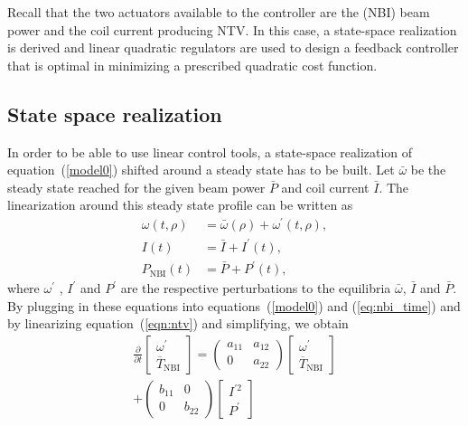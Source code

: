 \documentclass{iopart}
\begin{document}
 Recall that the two actuators available to the controller are the (NBI) beam power and the coil current producing NTV.
In this case, a state-space realization is derived and linear quadratic regulators are used to design a feedback controller that is optimal in minimizing a prescribed quadratic cost function.

\subsection{State space realization}
\label{SS}
In order to be able to use linear control tools, a state-space realization of equation~(\ref{model0})  shifted around a steady state has to be built.
Let $\bar{\omega}$ be the steady state reached for the given beam power $ \bar{P}$ and coil current $\bar{I}$. The linearization around this steady state profile can be written as
\begin{align}
\omega (t, \rho) &= \bar{\omega} (\rho) + \omega^{'}(t, \rho), \\
I (t) &= \bar{I} + I^{'}(t),\\
P_\text{NBI} (t) &= \bar{P} + P^{'}(t),
\end{align}
where $ \omega^{'}$ , $ I^{'}$ and $P^{'}$ are the respective perturbations to the equilibria $\bar{\omega}$, $\bar{I}$ and $\bar{P}$.
By plugging in these equations into equations~(\ref{model0}) and (\ref{eq:nbi_time}) and by linearizing equation~(\ref{eqn:ntv}) and simplifying, we obtain
\begin{multline}
	\frac{\partial}{\partial t}   \left[\! \begin{array}{c}  \omega^{'} \\ \overline{T}_\text{NBI} \end{array}\!\right]
		={ \left(\! \begin{array}{cc} a_{11}  & a_{12} \\ 0 & a_{22} \end{array} \! \right)} \left[\! \begin{array}{c} \omega^{'} \\ \overline{T}_\text{NBI}    \end{array}  \!\right] \\
		+ \left(\! \begin{array}{cc} b_{11}  & 0 \\ 0 & b_{22}    \end{array}  \!\right) \left[\! \begin{array}{c}  I^{'2}  \\ P^{'}\end{array}\!\right]
	\label{SSR}
\end{multline}
\end{document}
